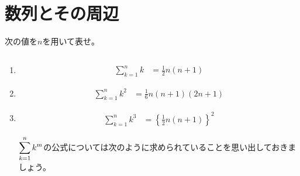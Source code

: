 \documentclass[a4paper]{ltjsarticle}
\newcommand{\flan}[1]{\begin{fleqn}[20pt]\begin{align*} #1 \end{align*}\end{fleqn}}
\begin{document}
\newpage
\section{数列とその周辺}
\begin{question*}
次の値を$n$を用いて表せ。
\begin{ans*}
${}$
\begin{enumerate}[label=\arabic*.]
  \item
    \flan{
        \sum_{k=1}^{n}k
        &= \frac{1}{2}n(n+1)
    }
  \item
    \flan{
        \sum_{k=1}^{n}k^2
        &= \frac{1}{6}n (n+1)(2n+1)
    }
  \item
    \flan{
        \sum_{k=1}^{n}k^3
        &= \left\{ \frac{1}{2}n(n+1) \right\}^2
    }
  \begin{supple*}
  $\displaystyle \sum_{k=1}^{n}k^m$の公式については次のように求められていることを思い出しておきましょう。


\end{supple*}
\end{enumerate}
\end{ans*}
\end{question*}
\end{document}
